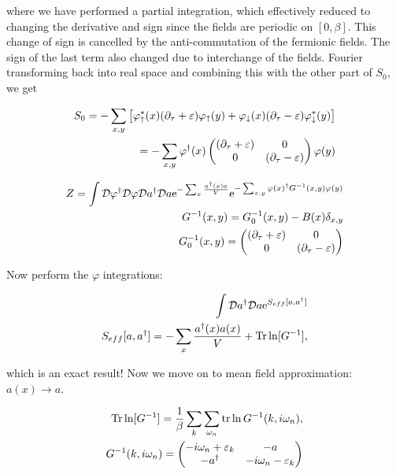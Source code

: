 where we have performed a partial integration, which effectively reduced to changing the derivative and sign since the fields are periodic on $[0, \beta]$. This change of sign is cancelled by the anti-commutation of the fermionic fields. The sign of the last term also changed due to interchange of the fields. Fourier transforming back into real space and combining this with the other part of $S_0$, we get 

\begin{align*}
    S_0 = -\sum_{x,y} \left[ \varphi_\uparrow^*(x)(\partial_\tau + \varepsilon)\varphi_\uparrow(y) + \varphi_\downarrow(x) (\partial_\tau - \varepsilon)\varphi_\downarrow^*(y) \right] \\ 
    = -\sum_{x,y} \varphi^\dagger (x)\begin{pmatrix}(\partial_\tau + \varepsilon)  & 0 \\ 0 & (\partial_\tau -\varepsilon) \end{pmatrix} \varphi(y)
\end{align*}

\begin{align*}
    Z = \int \mathcal{D} \varphi^\dagger \mathcal{D} \varphi \mathcal{D} a^{\dagger} \mathcal{D} a \mathrm{e}^{-\sum_x \frac{a^{\dagger} (x) a}{V}} \mathrm{e}^{-\sum_{x,y} \varphi(x)^\dagger G^{-1}(x,y)\varphi(y)} \\ 
    G^{-1}(x,y) = G_0 ^{-1} (x,y) - B(x) \delta_{x,y} \\
    G_0^{-1}(x,y) = \begin{pmatrix}(\partial_\tau + \varepsilon)  & 0 \\ 0 & (\partial_\tau -\varepsilon) \end{pmatrix}
\end{align*}

Now perform the $\varphi$ integrations: 

\begin{align*}
    \int \mathcal{D} a^{\dagger} \mathcal{D} a \mathrm{e}^{S_{eff}[a, a^{\dagger}]} \\ 
    S_{eff}[a, a^{\dagger}] = -\sum_x \frac{a^{\dagger}(x) a(x)}{V} + \Tr \ln [G^{-1} ],
\end{align*}

which is an exact result! Now we move on to mean field approximation: $a(x) \to a$. 

\begin{align*}
    \Tr \ln [G^{-1}] = \frac{1}{\beta} \sum_k \sum_{\omega_n} \tr \ln G^{-1} (k, i\omega_n), \\ 
    G^{-1}(k, i\omega_n) = \begin{pmatrix}-i\omega_n + \varepsilon_k  & -a \\ -a^{\dagger} & -i\omega_n -\varepsilon_k \end{pmatrix}
\end{align*}

